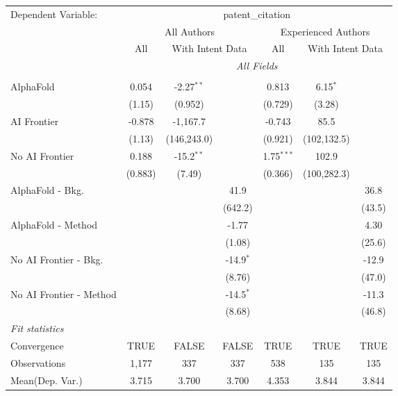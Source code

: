 \begingroup
\centering
\begin{tabular}{lcccccc}
   \tabularnewline \midrule \midrule
   Dependent Variable: & \multicolumn{6}{c}{patent\_citation}\\
 & \multicolumn{3}{c}{All Authors} & \multicolumn{3}{c}{Experienced Authors} \\
\cmidrule(lr){2-4} \cmidrule(lr){5-7}
 & \multicolumn{1}{c}{All} & \multicolumn{2}{c}{With Intent Data} & \multicolumn{1}{c}{All} & \multicolumn{2}{c}{With Intent Data} \\
\cmidrule(lr){2-2} \cmidrule(lr){3-4} \cmidrule(lr){5-5} \cmidrule(lr){6-7}
 & \multicolumn{6}{c}{\textit{All Fields}} \\ \\
   AlphaFold               & 0.054   & -2.27$^{**}$ &             & 0.813        & 6.15$^{*}$  &   \\   
                           & (1.15)  & (0.952)      &             & (0.729)      & (3.28)      &   \\   
   AI Frontier             & -0.878  & -1,167.7     &             & -0.743       & 85.5        &   \\   
                           & (1.13)  & (146,243.0)  &             & (0.921)      & (102,132.5) &   \\   
   No AI Frontier          & 0.188   & -15.2$^{**}$ &             & 1.75$^{***}$ & 102.9       &   \\   
                           & (0.883) & (7.49)       &             & (0.366)      & (100,282.3) &   \\   
   AlphaFold - Bkg.        &         &              & 41.9        &              &             & 36.8\\   
                           &         &              & (642.2)     &              &             & (43.5)\\   
   AlphaFold - Method      &         &              & -1.77       &              &             & 4.30\\   
                           &         &              & (1.08)      &              &             & (25.6)\\   
   No AI Frontier - Bkg.   &         &              & -14.9$^{*}$ &              &             & -12.9\\   
                           &         &              & (8.76)      &              &             & (47.0)\\   
   No AI Frontier - Method &         &              & -14.5$^{*}$ &              &             & -11.3\\   
                           &         &              & (8.68)      &              &             & (46.8)\\   
   \midrule
   \emph{Fit statistics}\\
   Convergence             &TRUE     & FALSE        & FALSE       & TRUE         & TRUE        & TRUE\\  
   Observations            & 1,177   & 337          & 337         & 538          & 135         & 135\\  
Mean(Dep. Var.) & 3.715 & 3.700 & 3.700 & 4.353 & 3.844 & 3.844 \\
   

\end{tabular}
